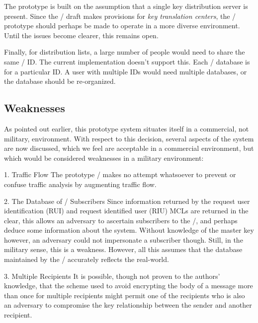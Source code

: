 The prototype is built on the assumption that a single key
distribution server is present.
Since the \ansi/ draft\cite{FIKM} makes provisions for
{\it key translation centers},
the \trustedmail/ prototype should perhaps be made to operate in a more diverse
environment.
Until the issues become clearer,
this remains open.

Finally,
for distribution lists,
a large number of people would need to share the same \KDS/ ID.
The current implementation doesn't support this.
Each \TMA/ database is for a particular ID.
A user with multiple IDs would need multiple databases,
or the database should be re-organized.

\subsection{Weaknesses}
As pointed out earlier,
this prototype system situates itself in a commercial, not military,
environment.
With respect to this decision,
several aspects of the system are now discussed,
which we feel are acceptable in a commercial environment,
but which would be considered weaknesses in a military environment:

\item{1.} Traffic Flow\hbreak
The prototype \TMA/ makes no attempt whatsoever to prevent or confuse traffic
analysis by augmenting traffic flow.

\item{2.} The Database of \KDS/ Subscribers\hbreak
Since information returned by the request user identification (RUI)
and request identified user (RIU) MCLs are returned in the clear,
this allows an adversary to ascertain subscribers to the \KDS/,
and perhaps deduce some information about the system.
Without knowledge of the master key however,
an adversary could not impersonate a subscriber though.
Still, in the military sense, this is a weakness.
However,
all this assumes that the database maintained by the \KDS/ accurately
reflects the real-world.

\item{3.} Multiple Recipients\hbreak
It is possible, though not proven to the authors' knowledge,
that the scheme used to avoid encrypting the body of a message more than once
for multiple recipients might permit one of the recipients who is also an
adversary to compromise the key relationship between the sender and another
recipient.

